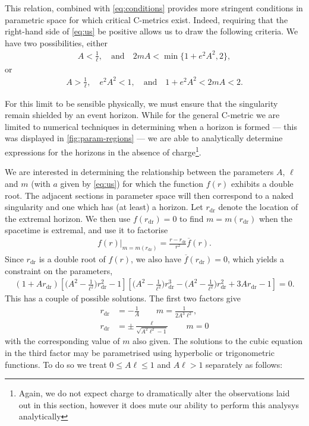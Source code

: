\documentclass[
twoside,
openright,
frontopenright,
]{dmathesis}
\newcommand{\nn}{\nonumber}
\newcommand{\dr}{\mathrm{dr}}
\begin{document}
This relation, combined with \cref{eq:conditions} provides more stringent
conditions in parametric space for which critical C-metrics exist. Indeed,
requiring that the right-hand side of \cref{eq:us} be positive allows us to draw
the following criteria. We have two possibilities, either
\begin{align}\label{eq:case1}
A<\frac{1}{\ell},\quad \mbox{and}\quad 2mA<\min \{1+e^2A^2,2\},
\end{align}
or
\begin{align}\label{eq:case2}
A>\frac{1}{\ell}, \quad e^2A^2<1, \quad \mbox{and} \quad 1+e^2A^2<2mA<2.
\end{align}

For this limit to be sensible physically, we must ensure that the singularity
remain shielded by an event horizon. While for the general C-metric we are
limited to numerical techniques in determining when a horizon is formed --- this
was displayed in \cref{fig:param-regions} --- we are able to analytically
determine expressions for the horizons in the absence of charge\footnote{Again,
  we do not expect charge to dramatically alter the observations laid out in
  this section, however it does mute our ability to perform this analysys
  analytically}.

We are interested in determining the relationship between the parameters $A$,
$\ell$ and $m$ (with $a$ given by \cref{eq:us}) for which the function $f(r)$
exhibits a double root. The adjacent sections in parameter space will then
correspond to a naked singularity and one which has (at least) a horizon. Let
$r_\dr$ denote the location of the extremal horizon. We then use $f(r_\dr)=0$ to
find $m=m(r_\dr)$ when the spacetime is extremal, and use it to factorise
\begin{align}
f(r)\big|_{m=m(r_\dr)}=\frac{r-r_\dr}{r^2}\overline{f}(r).
\end{align}
Since $r_\dr$ is a double root of $f(r)$, we also have $\overline{f}(r_\dr)=0$,
which yields a constraint on the parameters,
\begin{align}
 (1+Ar_\dr)\left[\Big(A^{2}-\frac{1}{\ell^2}\Big)r_\dr^2-1\right]\left[\Big(A^2-\frac{1}{\ell^2}\Big)r_\dr^3-\Big(A^2-\frac{1}{\ell^2}\Big)r_\dr^2+3Ar_\dr-1\right]=0.
\end{align}
This has a couple of possible solutions. The first two factors give
\begin{align}
r_\dr &=- \frac{1}{A} \qquad m = \frac{1}{2A^3\ell^2},\nn\\
r_\dr &= \pm\frac{\ell}{\sqrt{A^2\ell^2-1}}\qquad m =0
\end{align}
with the corresponding value of $m$ also given. The solutions to the cubic
equation in the third factor may be parametrised using hyperbolic or
trigonometric functions. To do so we treat $0\leqslant A\ell\leqslant 1$ and
$A\ell>1$ separately as follows:
\end{document}

